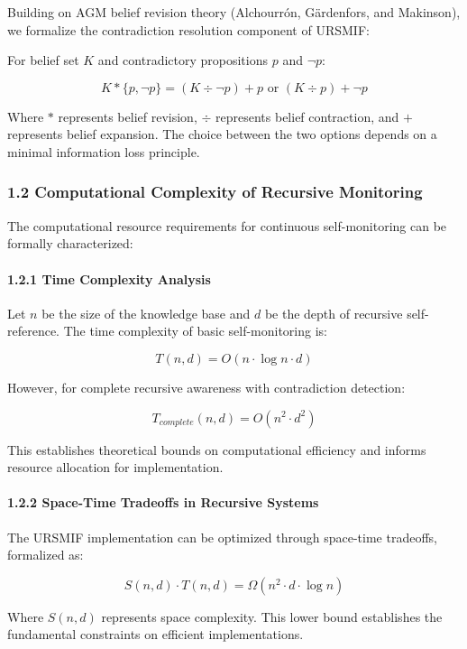 \documentclass[
]{article}
\begin{document}
Building on AGM belief revision theory (Alchourrón, Gärdenfors, and
Makinson), we formalize the contradiction resolution component of
URSMIF:

For belief set \(K\) and contradictory propositions \(p\) and
\(\neg p\):

\[K * \{p, \neg p\} = (K \div \neg p) + p \text{ or } (K \div p) + \neg p\]

Where \(*\) represents belief revision, \(\div\) represents belief
contraction, and \(+\) represents belief expansion. The choice between
the two options depends on a minimal information loss principle.

\subsubsection{1.2 Computational Complexity of Recursive
Monitoring}\label{computational-complexity-of-recursive-monitoring}

The computational resource requirements for continuous self-monitoring
can be formally characterized:

\paragraph{1.2.1 Time Complexity
Analysis}\label{time-complexity-analysis}

Let \(n\) be the size of the knowledge base and \(d\) be the depth of
recursive self-reference. The time complexity of basic self-monitoring
is:

\[T(n, d) = O(n \cdot \log n \cdot d)\]

However, for complete recursive awareness with contradiction detection:

\[T_{complete}(n, d) = O(n^2 \cdot d^2)\]

This establishes theoretical bounds on computational efficiency and
informs resource allocation for implementation.

\paragraph{1.2.2 Space-Time Tradeoffs in Recursive
Systems}\label{space-time-tradeoffs-in-recursive-systems}

The URSMIF implementation can be optimized through space-time tradeoffs,
formalized as:

\[S(n, d) \cdot T(n, d) = \Omega(n^2 \cdot d \cdot \log n)\]

Where \(S(n, d)\) represents space complexity. This lower bound
establishes the fundamental constraints on efficient implementations.
\end{document}
